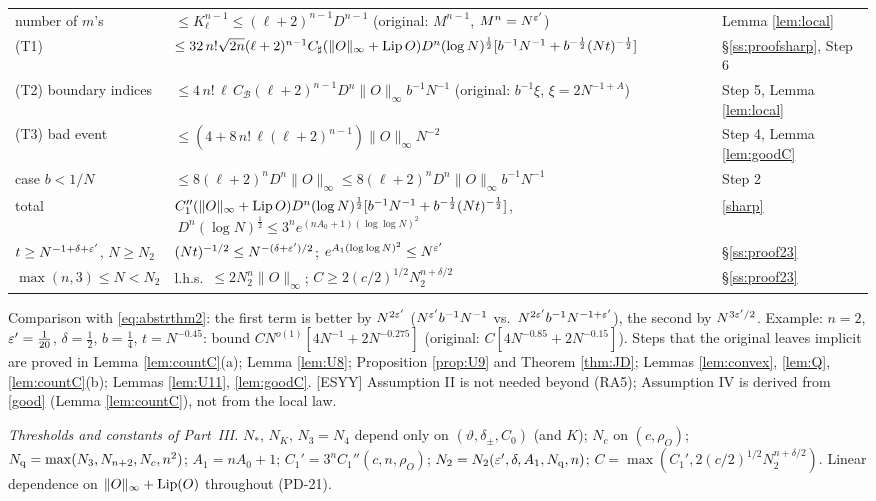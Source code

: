 \begin{center}
\begin{tabular}{|p{3.1cm}|p{9.1cm}|p{2.7cm}|}
number of $m$'s & $\le K_\ell^{n-1}\le(\ell+2)^{n-1}D^{n-1}$ (original: $M^{n-1}$, $M^n=N^{\varepsilon'}$) & Lemma \ref{lem:local}\\
(T1) & $\le32\,n!\sqrt{2n}(\ell+2)^{n-1}C_\sharp(\|O\|_\infty+\operatorname{Lip} O)D^n(\log N)^{\frac12}[b^{-1}N^{-1}+b^{-\frac12}(Nt)^{-\frac12}]$ & \S\ref{ss:proofsharp}, Step 6\\
(T2) boundary indices & $\le4\,n!\,\ell\,C_{\mathcal B}(\ell+2)^{n-1}D^n\|O\|_\infty b^{-1}N^{-1}$ (original: $b^{-1}\xi$, $\xi=2N^{-1+A}$) & Step 5, Lemma \ref{lem:local}\\
(T3) bad event & $\le(4+8\,n!\,\ell(\ell+2)^{n-1})\|O\|_\infty N^{-2}$ & Step 4, Lemma \ref{lem:goodC}\\
case $b<1/N$ & $\le8(\ell+2)^nD^n\|O\|_\infty\le8(\ell+2)^nD^n\|O\|_\infty b^{-1}N^{-1}$ & Step 2\\\hline
total & $C_1''(\|O\|_\infty+\operatorname{Lip} O)D^n(\log N)^{\frac12}[b^{-1}N^{-1}+b^{-\frac12}(Nt)^{-\frac12}]$, $\ D^n(\log N)^{\frac12}\le3^ne^{(nA_0+1)(\log\log N)^2}$ & \eqref{sharp}\\
$t\ge N^{-1+\delta+\varepsilon'}$, $N\ge N_2$ & $(Nt)^{-1/2}\le N^{-(\delta+\varepsilon')/2}$; $e^{A_1(\log\log N)^2}\le N^{\varepsilon'}$ & \S\ref{ss:proof23}\\
$\max(n,3)\le N<N_2$ & l.h.s.\ $\le2N_2^n\|O\|_\infty$; $C\ge2(c/2)^{1/2}N_2^{n+\delta/2}$ & \S\ref{ss:proof23}\\\hline
\end{tabular}
\end{center}
\noindent Comparison with \eqref{eq:abstrthm2}: the first term is better by $N^{2\varepsilon'}$ ($N^{\varepsilon'}b^{-1}N^{-1}$ vs.\ $N^{2\varepsilon'}b^{-1}N^{-1+\varepsilon'}$), the second by $N^{3\varepsilon'/2}$.
Example: $n=2$, $\varepsilon'=\frac1{20}$, $\delta=\frac12$, $b=\frac14$, $t=N^{-0.45}$: bound $CN^{o(1)}[4N^{-1}+2N^{-0.275}]$ (original: $C[4N^{-0.85}+2N^{-0.15}]$).
Steps that the original leaves implicit are proved in Lemma \ref{lem:countC}(a); Lemma \ref{lem:U8}; Proposition \ref{prop:U9} and Theorem \ref{thm:JD}; Lemmas \ref{lem:convex}, \ref{lem:Q}, \ref{lem:countC}(b); Lemmas \ref{lem:U11}, \ref{lem:goodC}.
[ESYY] Assumption II is not needed beyond (RA5); Assumption IV is derived from \eqref{good} (Lemma \ref{lem:countC}), not from the local law.

\noindent\emph{Thresholds and constants of Part~III.} $N_*$, $N_K$, $N_3=N_4$ depend only on $(\vartheta,\delta_\pm,C_0)$ (and $K$); $N_c$ on $(c,\rho_O)$; $N_{\rm q}=\max(N_3,N_{n+2},N_c,n^2)$; $A_1=nA_0+1$; $C_1'=3^nC_1''(c,n,\rho_O)$; $N_2=N_2(\varepsilon',\delta,A_1,N_{\rm q},n)$; $C=\max(C_1',2(c/2)^{1/2}N_2^{n+\delta/2})$. Linear dependence on $\|O\|_\infty+\operatorname{Lip}(O)$ throughout (PD-21).

